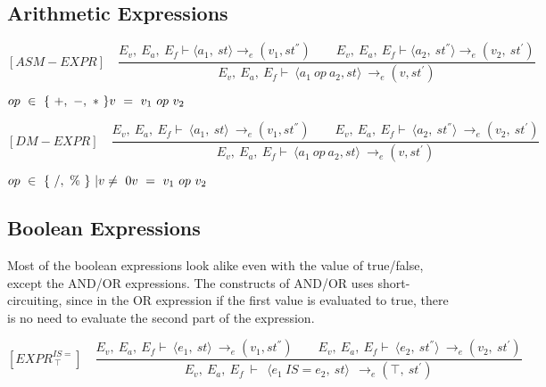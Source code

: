 	\subsection{Arithmetic Expressions}
	
	
	
	
	
	\[
	[ASM-EXPR] \quad	
	\dfrac{E_v, \ E_a, \ E_f \vdash \langle a_1, \ st \rangle \rightarrow_{e} (v_1, st^{''}) \qquad E_v, \ E_a, \ E_f \vdash \langle a_2, \ st^{''}\rangle \rightarrow_e (v_2, \ st^{'})}{E_v, \ E_a, \ E_f \vdash \ \langle a_1 \ op \ a_2, st \rangle \ \rightarrow_{e} (v, st^{'})}	
	\]
	
	
	\begin{math}		
		op \ \in \ \{ \ +, \ -, \ * \ \} \newline		
		v \ = \ v_1 \ op \ v_2		
	\end{math}
	
	
	
	
	
	\[
	[DM-EXPR] \quad
	\dfrac{E_v, \ E_a, \ E_f \vdash \ \langle a_1, \ st \rangle \ \rightarrow_{e} (v_1, st^{''}) \qquad E_v, \ E_a, \ E_f \vdash \ \langle a_2, \ st^{''} \rangle \ \rightarrow_e (v_2, \ st^{'})}{E_v, \ E_a, \ E_f \vdash \ \langle a_1 \ op \ a_2, st \rangle \ \rightarrow_{e} (v, st^{'})}	
	\]
	
	
	\begin{math}		
		op \ \in \ \{ \ /, \ \% \ \} \ | v \not= \ 0 \newline 		
		v \ = \ v_1 \ op \ v_2		
	\end{math} 
	
	
	
	
	
	\subsection{Boolean Expressions}
	
	
	Most of the boolean expressions look alike even with the value of true/false, except the AND/OR expressions. The constructs of AND/OR uses short-circuiting, since in the OR expression if the first value is evaluated to true, there is no need to evaluate the second part of the expression.
	
	
	\[
	[EXPR^{IS=}_{\ \top}] \quad	
	\dfrac{E_v, \ E_a, \ E_f \vdash \ \langle e_1, \ st \rangle \ \rightarrow_e (v_1, st^{''}) \qquad E_v, \ E_a, \ E_f \vdash \ \langle e_2, \ st^{''} \rangle \ \rightarrow_e (v_2, \ st^{'})}{E_v, \ E_a, \ E_f \ \vdash \ \ \langle e_1 \ IS= e_2, \ st \rangle \ \ \rightarrow_e (\top, \ st^{'})}	
	\]
	

